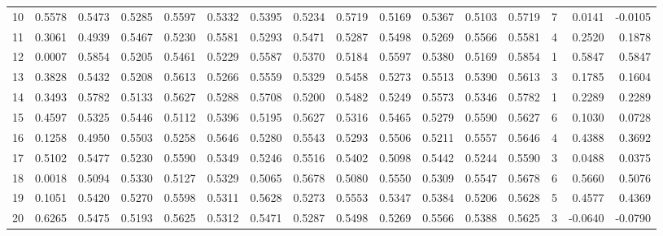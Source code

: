 \begin{tabular}{lrrrrrrrrrrrrrrr}
10  &      0.5578 &  0.5473 &  0.5285 &  0.5597 &  0.5332 &  0.5395 &  0.5234 &  0.5719 &  0.5169 &  0.5367 &   0.5103 &     0.5719 &      7 &                    0.0141 &                    -0.0105 \\
11  &      0.3061 &  0.4939 &  0.5467 &  0.5230 &  0.5581 &  0.5293 &  0.5471 &  0.5287 &  0.5498 &  0.5269 &   0.5566 &     0.5581 &      4 &                    0.2520 &                     0.1878 \\
12  &      0.0007 &  0.5854 &  0.5205 &  0.5461 &  0.5229 &  0.5587 &  0.5370 &  0.5184 &  0.5597 &  0.5380 &   0.5169 &     0.5854 &      1 &                    0.5847 &                     0.5847 \\
13  &      0.3828 &  0.5432 &  0.5208 &  0.5613 &  0.5266 &  0.5559 &  0.5329 &  0.5458 &  0.5273 &  0.5513 &   0.5390 &     0.5613 &      3 &                    0.1785 &                     0.1604 \\
14  &      0.3493 &  0.5782 &  0.5133 &  0.5627 &  0.5288 &  0.5708 &  0.5200 &  0.5482 &  0.5249 &  0.5573 &   0.5346 &     0.5782 &      1 &                    0.2289 &                     0.2289 \\
15  &      0.4597 &  0.5325 &  0.5446 &  0.5112 &  0.5396 &  0.5195 &  0.5627 &  0.5316 &  0.5465 &  0.5279 &   0.5590 &     0.5627 &      6 &                    0.1030 &                     0.0728 \\
16  &      0.1258 &  0.4950 &  0.5503 &  0.5258 &  0.5646 &  0.5280 &  0.5543 &  0.5293 &  0.5506 &  0.5211 &   0.5557 &     0.5646 &      4 &                    0.4388 &                     0.3692 \\
17  &      0.5102 &  0.5477 &  0.5230 &  0.5590 &  0.5349 &  0.5246 &  0.5516 &  0.5402 &  0.5098 &  0.5442 &   0.5244 &     0.5590 &      3 &                    0.0488 &                     0.0375 \\
18  &      0.0018 &  0.5094 &  0.5330 &  0.5127 &  0.5329 &  0.5065 &  0.5678 &  0.5080 &  0.5550 &  0.5309 &   0.5547 &     0.5678 &      6 &                    0.5660 &                     0.5076 \\
19  &      0.1051 &  0.5420 &  0.5270 &  0.5598 &  0.5311 &  0.5628 &  0.5273 &  0.5553 &  0.5347 &  0.5384 &   0.5206 &     0.5628 &      5 &                    0.4577 &                     0.4369 \\
20  &      0.6265 &  0.5475 &  0.5193 &  0.5625 &  0.5312 &  0.5471 &  0.5287 &  0.5498 &  0.5269 &  0.5566 &   0.5388 &     0.5625 &      3 &                   -0.0640 &                    -0.0790 \\

\end{tabular}

